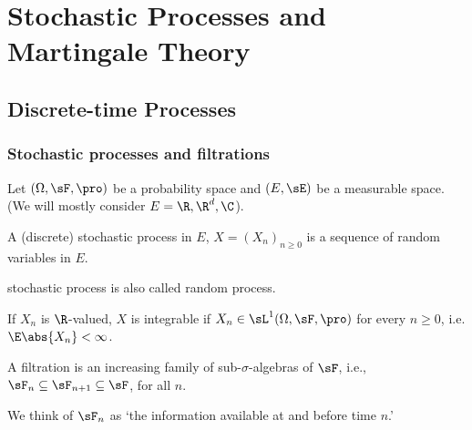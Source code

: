 \chapter{Stochastic Processes and Martingale Theory}

\section{Discrete-time Processes}

\subsection{Stochastic processes and filtrations}

Let $(\Omega,\sF,\pro)$ be a probability space and $(E,\sE)$ be a measurable space. (We will mostly consider $E =\R,\R^d,\C$). %

\begin{definition}
A (discrete) stochastic process in $E$, $X = (X_n)_{n\geq 0}$ is a sequence of random variables in $E$.
\end{definition}

\begin{remark}
stochastic process is also called random process.
\end{remark}

\begin{definition}\label{def:integrable_stochastic_process_discrete}
If $X_n$ is $\R$-valued, $X$ is integrable if $X_n \in \sL^1(\Omega,\sF,\pro)$ for every $n\geq 0$, i.e. $\E\abs{X_n} <\infty$.
\end{definition}

\begin{definition}\label{def:filtration_discrete}
A filtration is an increasing family of sub-$\sigma$-algebras of $\sF$, i.e., $\sF_{n}\subseteq \sF_{n+1}\subseteq \sF$, for all $n$. %
\end{definition}

\begin{remark}
We think of $\sF_n$ as `the information available at and before time $n$.'
\end{remark}

